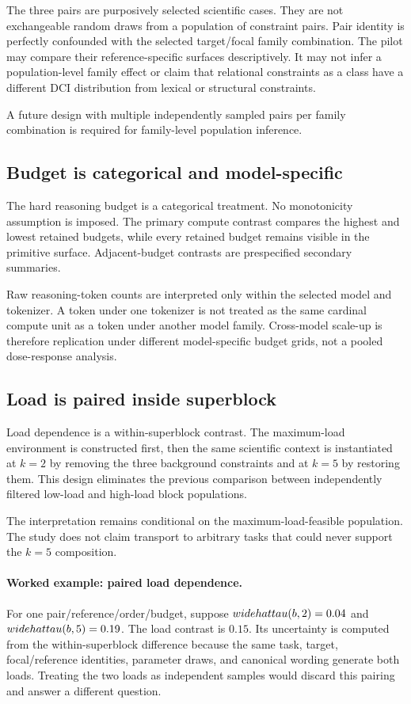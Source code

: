 \documentclass[11pt,a4paper]{article}
\begin{document}
The three pairs are purposively selected scientific cases. They are not exchangeable random draws from a population of constraint pairs. Pair identity is perfectly confounded with the selected target/focal family combination. The pilot may compare their reference-specific surfaces descriptively. It may not infer a population-level family effect or claim that relational constraints as a class have a different DCI distribution from lexical or structural constraints.

A future design with multiple independently sampled pairs per family combination is required for family-level population inference.

\subsection{Budget is categorical and model-specific}

The hard reasoning budget is a categorical treatment. No monotonicity assumption is imposed. The primary compute contrast compares the highest and lowest retained budgets, while every retained budget remains visible in the primitive surface. Adjacent-budget contrasts are prespecified secondary summaries.

Raw reasoning-token counts are interpreted only within the selected model and tokenizer. A token under one tokenizer is not treated as the same cardinal compute unit as a token under another model family. Cross-model scale-up is therefore replication under different model-specific budget grids, not a pooled dose-response analysis.

\subsection{Load is paired inside superblock}

Load dependence is a within-superblock contrast. The maximum-load environment is constructed first, then the same scientific context is instantiated at $k=2$ by removing the three background constraints and at $k=5$ by restoring them. This design eliminates the previous comparison between independently filtered low-load and high-load block populations.

The interpretation remains conditional on the maximum-load-feasible population. The study does not claim transport to arbitrary tasks that could never support the $k=5$ composition.


\paragraph{Worked example: paired load dependence.}
For one pair/reference/order/budget, suppose $\\widehat\\tau(b,2)=0.04$ and $\\widehat\\tau(b,5)=0.19$. The load contrast is $0.15$. Its uncertainty is computed from the within-superblock difference because the same task, target, focal/reference identities, parameter draws, and canonical wording generate both loads. Treating the two loads as independent samples would discard this pairing and answer a different question.
\end{document}
